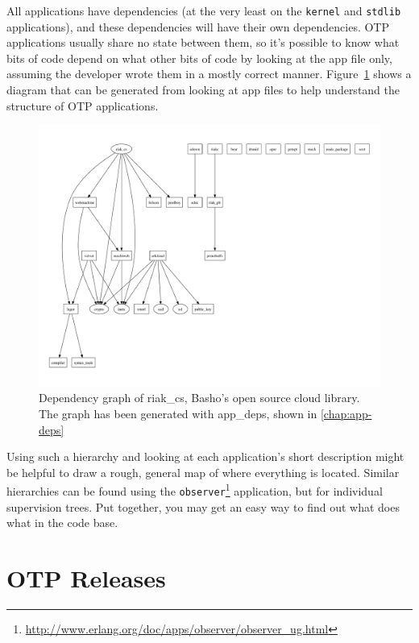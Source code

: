 \documentclass[11pt, oneside]{book}   	%
\newcommand{\module}[1]{\Verb`#1`}
\begin{document}
All applications have dependencies (at the very least on the \module{kernel} and \module{stdlib} applications), and these dependencies will have their own dependencies. OTP applications usually share no state between them, so it's possible to know what bits of code depend on what other bits of code by looking at the app file only, assuming the developer wrote them in a mostly correct manner. Figure~\ref{fig:app-deps} shows a diagram that can be generated from looking at app files to help understand the structure of OTP applications.


\begin{figure}
  \includegraphics{app-deps-riak-cs.pdf}%
  \caption{Dependency graph of riak\_cs, Basho's open source cloud library.
  The graph has been generated with app\_deps, shown in \ref{chap:app-deps}}%
   \label{fig:app-deps}
\end{figure}

Using such a hierarchy and looking at each application's short description might be helpful to draw a rough, general map of where everything is located. Similar hierarchies can be found using the \module{observer}\footnote{\href{http://www.erlang.org/doc/apps/observer/observer\_ug.html}{http://www.erlang.org/doc/apps/observer/observer\_ug.html}} application, but for individual supervision trees. Put together, you may get an easy way to find out what does what in the code base.

\section{OTP Releases}
\label{sec:dive-otp-releases}
\end{document}
